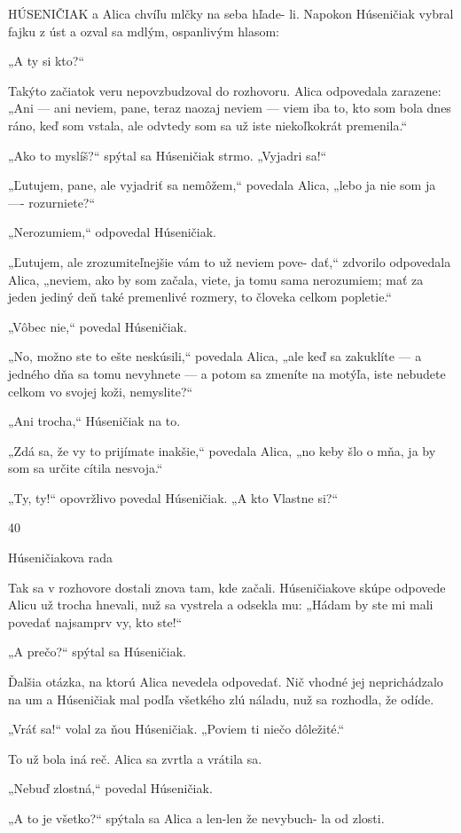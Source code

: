 \documentclass[12pt]{book}
\begin{document}
\begin{Parallel}[p]{}{}
{HÚSENIČIAK a Alica chvíľu mlčky na seba hľade-
li. Napokon Húseničiak vybral fajku z úst a ozval sa
mdlým, ospanlivým hlasom:

„A ty si kto?“

Takýto začiatok veru nepovzbudzoval do rozhovoru.
Alica odpovedala zarazene: „Ani — ani neviem, pane, teraz
naozaj neviem — viem iba to, kto som bola dnes ráno, keď
som vstala, ale odvtedy som sa už iste niekoľkokrát
premenila.“

„Ako to myslíš?“ spýtal sa Húseničiak strmo. „Vyjadri
sa!“

„Ľutujem, pane, ale vyjadriť sa nemôžem,“ povedala
Alica, „lebo ja nie som ja —- rozurniete?“

„Nerozumiem,“ odpovedal Húseničiak.

„Ľutujem, ale zrozumiteľnejšie vám to už neviem pove-
dať,“ zdvorilo odpovedala Alica, „neviem, ako by som
začala, viete, ja tomu sama nerozumiem; mať za jeden
jediný deň také premenlivé rozmery, to človeka celkom
popletie.“

„Vôbec nie,“ povedal Húseničiak.

„No, možno ste to ešte neskúsili,“ povedala Alica, „ale
keď sa zakuklíte — a jedného dňa sa tomu nevyhnete
— a potom sa zmeníte na motýľa, iste nebudete celkom vo
svojej koži, nemyslite?“

„Ani trocha,“ Húseničiak na to.

„Zdá sa, že vy to prijímate inakšie,“ povedala Alica, „no
keby šlo o mňa, ja by som sa určite cítila nesvoja.“

„Ty, ty!“ opovržlivo povedal Húseničiak. „A kto Vlastne
si?“

40

Húseničiakova rada

Tak sa v rozhovore dostali znova tam, kde začali.
Húseničiakove skúpe odpovede Alicu už trocha hnevali, nuž
sa vystrela a odsekla mu: „Hádam by ste mi mali povedať
najsamprv vy, kto ste!“

„A prečo?“ spýtal sa Húseničiak.

Ďalšia otázka, na ktorú Alica nevedela odpovedať. Nič
vhodné jej neprichádzalo na um a Húseničiak mal podľa
všetkého zlú náladu, nuž sa rozhodla, že odíde.

„Vráť sa!“ volal za ňou Húseničiak. „Poviem ti niečo
dôležité.“

To už bola iná reč. Alica sa zvrtla a vrátila sa.

„Nebuď zlostná,“ povedal Húseničiak.

„A to je všetko?“ spýtala sa Alica a len-len že nevybuch-
la od zlosti.

}
\end{Parallel}
\end{document}
